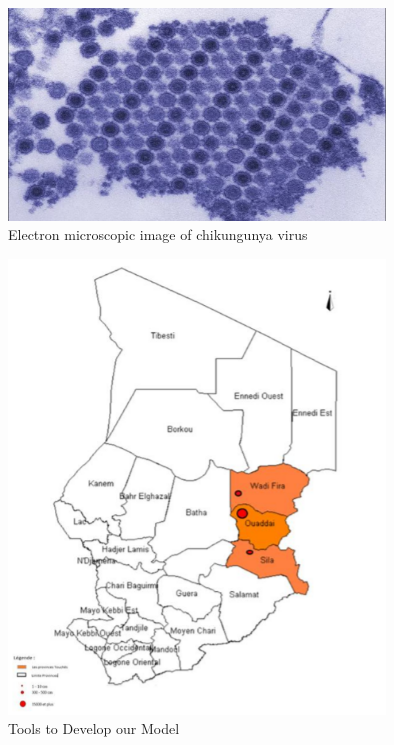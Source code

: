 \begin{figure}[!h]
	\begin{center}
		\includegraphics[width=10cm]{images/CHIK_17550_TEM}
	\end{center}
	\caption{Electron microscopic image of chikungunya virus}
	\label{fig:chikv}
\end{figure}

\begin{figure}[!h]
	\begin{center}
		\includegraphics[width=10cm]{images/chadmap}
	\end{center}
	\caption{Tools to Develop our Model}
	\label{Tools to Develop our Model}
\end{figure}

